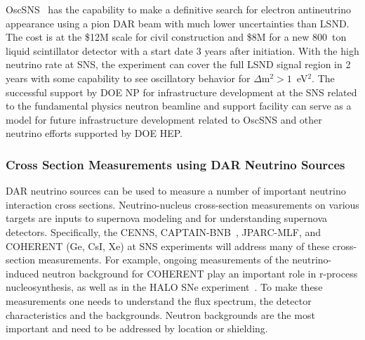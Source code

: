 
\noindent OscSNS~\cite{OscSNS} has the capability to make a definitive
search for electron antineutrino appearance using a pion DAR beam with
much lower uncertainties than LSND. The cost is at the \$12M scale for
civil construction and \$8M for a new 800~ton liquid scintillator
detector with a start date 3 years after initiation. With the high
neutrino rate at SNS, the experiment can cover the full LSND signal
region in 2 years with some capability to see oscillatory behavior for
$\Delta$m$^2 > 1$~eV$^2$. The successful support by DOE NP for
infrastructure development at the SNS related to the fundamental
physics neutron beamline and support facility can serve as a model for
future infrastructure development related to OscSNS and other neutrino
efforts supported by DOE HEP.

\subsubsection{Cross Section Measurements using DAR Neutrino Sources}

\noindent DAR neutrino sources can be used to measure a number of
important neutrino interaction cross sections. Neutrino-nucleus
cross-section measurements on various targets are inputs to supernova
modeling and for understanding supernova detectors. Specifically, the
CENNS, CAPTAIN-BNB~\cite{Berns:2013usa}, JPARC-MLF, and COHERENT (Ge,
CsI, Xe) at SNS experiments will address many of these cross-section
measurements. For example, ongoing measurements of the
neutrino-induced neutron background for COHERENT play an important
role in r-process nucleosynthesis, as well as in the HALO SNe
experiment~\cite{halo}. To make these measurements one needs to
understand the flux spectrum, the detector characteristics and the
backgrounds. Neutron backgrounds are the most important and need to be
addressed by location or shielding.
